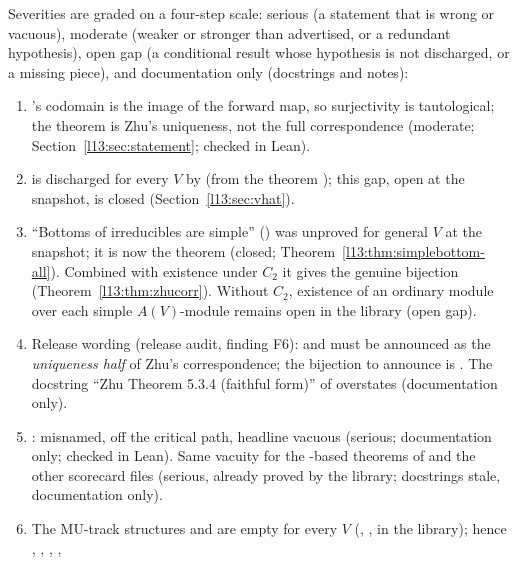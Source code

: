 Severities are graded on a four-step scale: serious (a statement that is wrong or vacuous), moderate (weaker or stronger than advertised, or a redundant
hypothesis), open gap (a conditional result whose hypothesis is not discharged, or a missing piece), and documentation
only (docstrings and notes):
\begin{enumerate}
\item {}'s codomain is the image of the forward map, so surjectivity is tautological; the theorem is Zhu's
  uniqueness, not the full correspondence (moderate; Section~\ref{l13:sec:statement}; checked in Lean).
\item {} is discharged for every $V$ by
   (from the theorem ); this gap, open at the snapshot, is closed
  (Section~\ref{l13:sec:vhat}).
\item ``Bottoms of irreducibles are simple'' () was unproved for general $V$ at the snapshot; it is now the
  theorem  (closed; Theorem~\ref{l13:thm:simplebottom-all}). Combined with existence under $C_2$ it gives
  the genuine bijection  (Theorem~\ref{l13:thm:zhucorr}). Without $C_2$, existence of an
  ordinary module over each simple $A(V)$-module remains open in the library (open gap).
\item Release wording (release audit, finding F6):  and  must be announced as the
  \emph{uniqueness half} of Zhu's correspondence; the bijection to announce is . The
  docstring ``Zhu Theorem 5.3.4 (faithful form)'' of  overstates (documentation only).
\item {}: misnamed, off the critical path, headline vacuous (serious; documentation only; checked in Lean). Same vacuity for the
  -based theorems of  and the other scorecard files (serious, already
  proved by the library; docstrings stale, documentation only).
\item The MU-track structures  and  are empty for every $V$
  (, , in the library); hence
  , , , ,

\end{enumerate}
